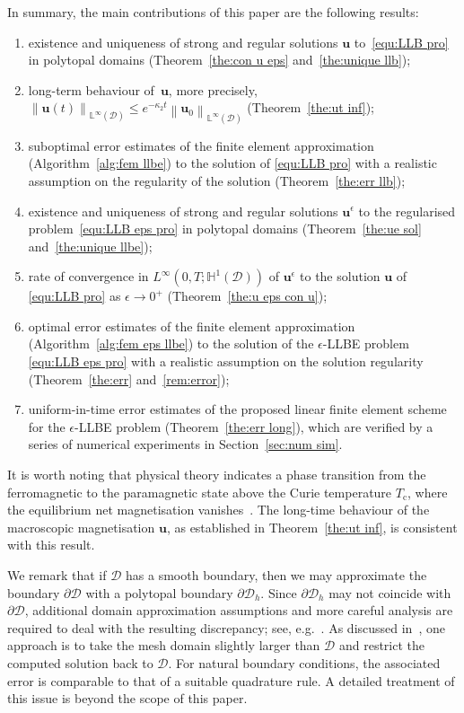 \documentclass[11pt,reqno]{amsart}
\theoremstyle{definition}
\numberwithin{equation}{section}
\newcommand{\bff}{\boldsymbol}
\newcommand{\bb}{\mathbb}
\newcommand{\norm}[2]{\left\|{#1}\right\|_{#2}}
\begin{document}
In summary, the main contributions of this paper are the following results:
\begin{enumerate}
	\item existence and uniqueness of strong and regular solutions $\bff{u}$ to~\eqref{equ:LLB
		pro} in polytopal domains (Theorem~\ref{the:con u eps} and~\ref{the:unique llb});
    \item long-term behaviour of~$\bff{u}$,
		more precisely, $\norm{\bff{u}(t)}{\bb{L}^\infty(\mathscr{D})} \leq e^{-\kappa_2 t} \norm{\bff{u}_0}{\bb{L}^\infty(\mathscr{D})}$ (Theorem~\ref{the:ut inf});
    \item suboptimal error estimates of the finite element approximation (Algorithm~\ref{alg:fem llbe}) to the solution of \eqref{equ:LLB pro} with a realistic assumption on the regularity of the solution (Theorem~\ref{the:err llb});
	\item existence and uniqueness of strong and regular solutions $\bff{u}^\epsilon$
		to the regularised problem~\eqref{equ:LLB eps pro} in polytopal domains (Theorem~\ref{the:ue sol} and~\ref{the:unique llbe});
	\item rate of convergence in $L^\infty(0,T;\bb{H}^1(\mathscr{D}))$ of
		$\bff{u}^\epsilon$ to the solution $\bff{u}$ of \eqref{equ:LLB pro} as
		$\epsilon\to 0^+$ (Theorem~\ref{the:u eps con u}); 
	\item optimal error estimates of the finite element approximation (Algorithm~\ref{alg:fem eps llbe}) to the solution of the $\epsilon$-LLBE problem \eqref{equ:LLB eps pro} with a realistic assumption on the solution regularity (Theorem~\ref{the:err} and~\ref{rem:error});
	\item uniform-in-time error estimates of
		the proposed linear finite element scheme for
		the $\epsilon$-LLBE problem (Theorem~\ref{the:err long}),
		which are verified by a series of numerical experiments in Section~\ref{sec:num sim}.
\end{enumerate}
It is worth noting that physical theory indicates a phase transition from the ferromagnetic to the paramagnetic state above the Curie temperature $T_\mathrm{c}$, where the equilibrium net magnetisation vanishes~\citep{ChuNowChaGar06, KazEtal08, VogAbe14}. The long-time behaviour of the macroscopic magnetisation $\bff{u}$, as established in Theorem~\ref{the:ut inf}, is consistent with this result.

{We remark that if $\mathscr{D}$ has a smooth boundary, then we may approximate the boundary $\partial\mathscr{D}$ with a polytopal boundary $\partial \mathscr{D}_h$. Since $\partial\mathscr{D}_h$ may not coincide with $\partial\mathscr{D}$, additional domain approximation assumptions and more careful analysis are required to deal with the resulting discrepancy; see, e.g.~\citep{Tho73, LinThoWah91}. As discussed in~\citep[Section~2]{SchThoWah98}, one approach is to take the mesh domain slightly larger than $\mathscr{D}$ and restrict the computed solution back to $\mathscr{D}$. For natural boundary conditions, the associated error is comparable to that of a suitable quadrature rule. A detailed treatment of this issue is beyond the scope of this paper.}
\end{document}
